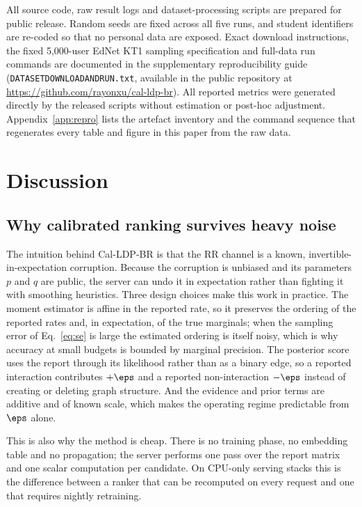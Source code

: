 All source code, raw result logs and dataset-processing scripts are prepared for public release. Random seeds are fixed across all five runs, and student identifiers are re-coded so that no personal data are exposed. Exact download instructions, the fixed 5{,}000-user EdNet KT1 sampling specification and full-data run commands are documented in the supplementary reproducibility guide (\texttt{DATASETDOWNLOADANDRUN.txt}, available in the public repository at \url{https://github.com/rayonxu/cal-ldp-br}). All reported metrics were generated directly by the released scripts without estimation or post-hoc adjustment. Appendix~\ref{app:repro} lists the artefact inventory and the command sequence that regenerates every table and figure in this paper from the raw data.

\section{Discussion}\label{sec:discussion}

\subsection{Why calibrated ranking survives heavy noise}

The intuition behind Cal-LDP-BR is that the RR channel is a known, invertible-in-expectation corruption. Because the corruption is unbiased and its parameters $p$ and $q$ are public, the server can undo it in expectation rather than fighting it with smoothing heuristics. Three design choices make this work in practice. The moment estimator is affine in the reported rate, so it preserves the ordering of the reported rates and, in expectation, of the true marginals; when the sampling error of Eq.~\eqref{eq:se} is large the estimated ordering is itself noisy, which is why accuracy at small budgets is bounded by marginal precision. The posterior score uses the report through its likelihood rather than as a binary edge, so a reported interaction contributes $+\eps$ and a reported non-interaction $-\eps$ instead of creating or deleting graph structure. And the evidence and prior terms are additive and of known scale, which makes the operating regime predictable from $\eps$ alone.

This is also why the method is cheap. There is no training phase, no embedding table and no propagation; the server performs one pass over the report matrix and one scalar computation per candidate. On CPU-only serving stacks this is the difference between a ranker that can be recomputed on every request and one that requires nightly retraining.

